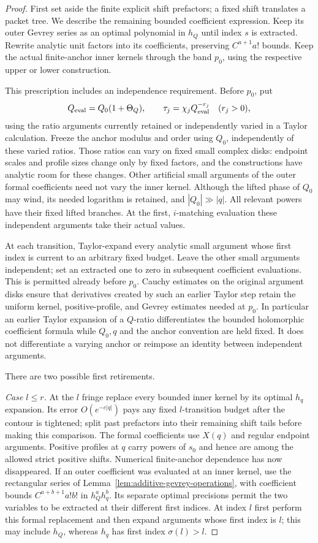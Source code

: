\begin{proof}
First set aside the finite explicit shift prefactors; a fixed shift
translates a packet tree.  We describe the remaining bounded
coefficient expression.  Keep its outer Gevrey series as an optimal
polynomial in $h_Q$ until index $s$ is extracted.  Rewrite analytic
unit factors into its coefficients, preserving $C^{a+1}a!$ bounds.
Keep the actual finite-anchor inner kernels through the band $p_0$,
using the respective upper or lower construction.

This prescription includes an independence requirement.  Before
$p_0$, put
\[
 Q_{\rm eval}=Q_0(1+\Theta_Q),\qquad
 \tau_j=\chi_jQ_{\rm eval}^{-r_j}\quad(r_j>0),
\]
using the ratio arguments currently retained or independently varied
in a Taylor calculation.  Freeze the anchor modulus and order using
$Q_0$, independently of these varied ratios.  Those ratios can vary
on fixed small complex disks: endpoint scales and profile sizes change
only by fixed factors, and the constructions have analytic room for
these changes.  Other artificial small arguments of the outer formal
coefficients need not vary the inner kernel.  Although the lifted
phase of $Q_0$ may wind, its needed logarithm is retained, and
$|Q_0|\gg|q|$.  All relevant powers have their fixed lifted branches.
At the first, $i$-matching evaluation these independent arguments take
their actual values.

At each transition, Taylor-expand every analytic small argument whose
first index is current to an arbitrary fixed budget.  Leave the other
small arguments independent; set an extracted one to zero in subsequent
coefficient evaluations.  This is permitted already before $p_0$.
Cauchy estimates on the original argument disks ensure that derivatives
created by such an earlier Taylor step retain the uniform kernel,
positive-profile, and Gevrey estimates needed at $p_0$.  In particular
an earlier Taylor expansion of a $Q$-ratio differentiates the bounded
holomorphic coefficient formula while $Q_0,q$ and the anchor convention
are held fixed.  It does not differentiate a varying anchor or
reimpose an identity between independent arguments.

There are two possible first retirements.

\emph{Case $l\le r$.}  At the $l$ fringe replace every bounded inner
kernel by its optimal $h_q$ expansion.  Its error $O(e^{-c|q|})$ pays
any fixed $l$-transition budget after the contour is tightened; split
past prefactors into their remaining shift tails before making this
comparison.  The formal coefficients use $X(q)$ and regular endpoint
arguments.  Positive profiles at $q$ carry powers of $s_0$ and hence
are among the allowed strict positive shifts.  Numerical finite-anchor
dependence has now disappeared.  If an outer coefficient was evaluated
at an inner kernel, use the rectangular series of
Lemma~\ref{lem:additive-gevrey-operations}, with coefficient bounds
$C^{a+b+1}a!b!$ in $h_Q^ah_q^b$.  Its separate optimal precisions
permit the two variables to be extracted at their different first
indices.  At index $l$ first perform this formal replacement and then
expand arguments whose first index is $l$; this may include $h_Q$,
whereas $h_q$ has first index $\sigma(l)>l$.


\end{proof}
